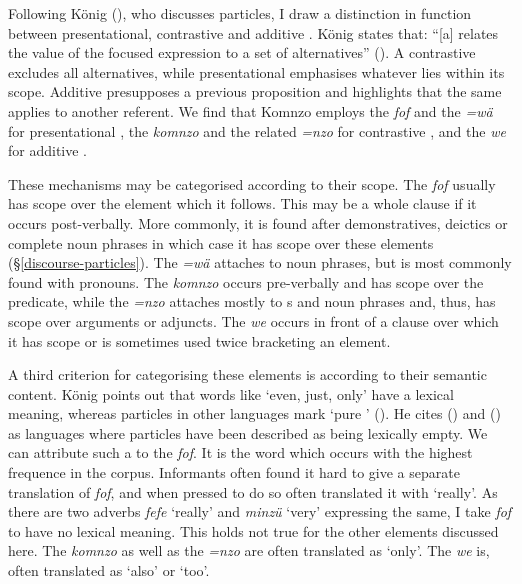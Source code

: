 Following König (\citeyear{Konig:1991vy}), who discusses  particles, I draw a distinction in function between presentational, contrastive and additive . König states that: ``[a]   relates the value of the focused expression to a set of alternatives'' (\citeyear[32]{Konig:1991vy}). A contrastive  excludes all alternatives,	 while presentational  emphasises whatever lies within its scope. Additive  presupposes a previous proposition and highlights that the same applies to another referent. We find that Komnzo employs the  \emph{fof} and the  \emph{=wä} for presentational , the  \emph{komnzo} and the related  \emph{=nzo} for contrastive , and the  \emph{we} for additive .

These mechanisms may be categorised according to their scope. The  \emph{fof} usually has scope over the element which it follows. This may be a whole clause if it occurs post-verbally. More commonly, it is found after demonstratives, deictics or complete noun phrases in which case it has scope over these elements ({\S}\ref{discourse-particles}). The  \emph{=wä} attaches to noun phrases, but is most commonly found with pronouns. The  \emph{komnzo} occurs pre-verbally and has scope over the predicate, while the  \emph{=nzo} attaches mostly to s and noun phrases and, thus, has scope over arguments or adjuncts. The  \emph{we} occurs in front of a clause over which it has scope or is sometimes used twice bracketing an element.

A third criterion for categorising these elements is according to their semantic content. König points out that  words like `even, just, only' have a lexical meaning, whereas  particles in other languages mark `pure ' (\citeyear[29ff.]{Konig:1991vy}). He cites  (\citealt[21ff.]{Saeed:1984wm}) and  (\citealt[476ff.]{Lichtenberk:1983vh}) as languages where  particles have been described as being lexically empty. We can attribute such a  to the  \emph{fof}. It is the word which occurs with the highest frequence in the corpus. Informants often found it hard to give a separate translation of \emph{fof}, and when pressed to do so often translated it with `really'. As there are two adverbs \emph{fefe} `really' and \emph{minzü} `very' expressing the same, I take \emph{fof} to have no lexical meaning. This holds not true for the other elements discussed here. The  \emph{komnzo} as well as the  \emph{=nzo} are often translated as `only'. The  \emph{we} is, often translated as `also' or `too'.

